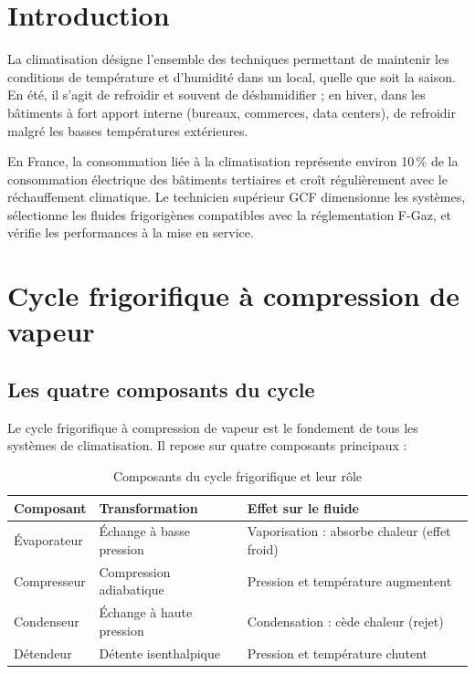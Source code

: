\section{Introduction}

La climatisation désigne l'ensemble des techniques permettant de maintenir les conditions de température et d'humidité dans un local, quelle que soit la saison. En été, il s'agit de refroidir et souvent de déshumidifier ; en hiver, dans les bâtiments à fort apport interne (bureaux, commerces, data centers), de refroidir malgré les basses températures extérieures.

En France, la consommation liée à la climatisation représente environ 10\,\% de la consommation électrique des bâtiments tertiaires et croît régulièrement avec le réchauffement climatique. Le technicien supérieur GCF dimensionne les systèmes, sélectionne les fluides frigorigènes compatibles avec la réglementation F-Gaz, et vérifie les performances à la mise en service.

\section{Cycle frigorifique à compression de vapeur}

\subsection{Les quatre composants du cycle}

Le cycle frigorifique à compression de vapeur est le fondement de tous les systèmes de climatisation. Il repose sur quatre composants principaux :

\begin{table}[H]
  \centering
  \caption{Composants du cycle frigorifique et leur rôle}
  \begin{tabular}{p{3cm}p{4.5cm}p{4cm}}
    \toprule
    Composant & Transformation & Effet sur le fluide \\
    \midrule
    Évaporateur & Échange à basse pression & Vaporisation : absorbe chaleur (effet froid) \\
    Compresseur & Compression adiabatique & Pression et température augmentent \\
    Condenseur & Échange à haute pression & Condensation : cède chaleur (rejet) \\
    Détendeur & Détente isenthalpique & Pression et température chutent \\
    \bottomrule
  \end{tabular}
\end{table}

